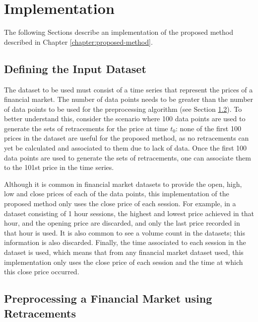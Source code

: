 \chapter{Implementation}
\label{chapter:implementation}

The following Sections describe an implementation of the proposed method
described in Chapter \ref{chapter:proposed-method}.

\section{Defining the Input Dataset}
\label{section:defining-the-input-dataset}

The dataset to be used must consist of a time series that represent the prices
of a financial market. The number of data points needs to be greater than the
number of data points to be used for the preprocessing algorithm (see Section
\ref{section:preprocessing-a-financial-market-using-retracements:implementation}). To
better understand this, consider the scenario where 100 data points are used to
generate the sets of retracements for the price at time $t_0$: none of the first
100 prices in the dataset are useful for the proposed method, as no retracements
can yet be calculated and associated to them due to lack of data. Once the first
100 data points are used to generate the sets of retracements, one can associate
them to the 101st price in the time series.

Although it is common in financial market datasets to provide the open, high,
low and close prices of each of the data points, this implementation of the
proposed method only uses the close price of each session. For example, in a
dataset consisting of 1 hour sessions, the highest and lowest price achieved in
that hour, and the opening price are discarded, and only the last price recorded
in that hour is used. It is also common to see a volume count in the datasets;
this information is also discarded. Finally, the time associated to each session
in the dataset is used, which means that from any financial market dataset used,
this implementation only uses the close price of each session and the time at
which this close price occurred.

\section{Preprocessing a Financial Market using Retracements}
\label{section:preprocessing-a-financial-market-using-retracements:implementation}

